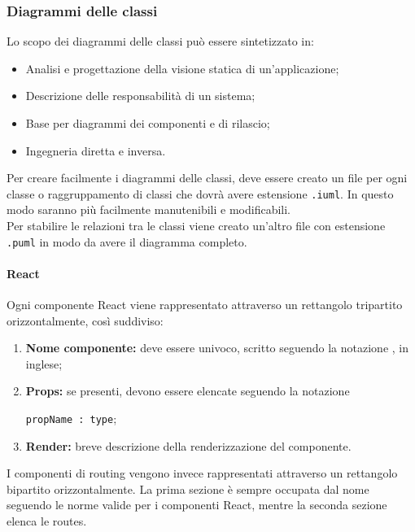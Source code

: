 \documentclass[NormeDiProgetto.tex]{subfiles}
\begin{document}
\subsubsection{Diagrammi delle classi}
Lo scopo dei diagrammi delle classi può essere sintetizzato in:
\begin{itemize}
	\item Analisi e progettazione della visione statica di un'applicazione;
	\item Descrizione delle responsabilità di un sistema;
	\item Base per diagrammi dei componenti e di rilascio;
	\item Ingegneria diretta e inversa.
\end{itemize}
Per creare facilmente i diagrammi delle classi, deve essere creato un file per ogni classe o raggruppamento di classi che dovrà avere estensione \texttt{.iuml}. In questo modo saranno più facilmente manutenibili e modificabili.\\
Per stabilire le relazioni tra le classi viene creato un'altro file con estensione \texttt{.puml} in modo da avere il diagramma completo.
\paragraph{React}
Ogni componente React viene rappresentato attraverso un rettangolo tripartito orizzontalmente, così suddiviso:
\begin{enumerate}
	\item \textbf{Nome componente:} deve essere univoco, scritto seguendo la notazione , in inglese;
	\item \textbf{Props:} se presenti, devono essere elencate seguendo la notazione
	\begin{center}
		\texttt{propName : type};
	\end{center}
	\item \textbf{Render:} breve descrizione della renderizzazione del componente.
\end{enumerate}
I componenti di routing vengono invece rappresentati attraverso un rettangolo bipartito orizzontalmente. La prima sezione è sempre occupata dal nome seguendo le norme valide per i componenti React, mentre la seconda sezione elenca le routes.
\end{document}
